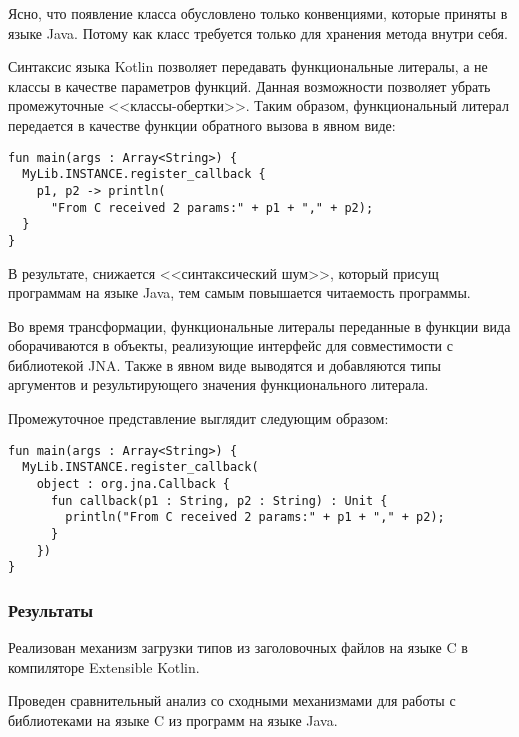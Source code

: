 Ясно, что появление класса  обусловлено только конвенциями, которые приняты в языке Java.
Потому как класс требуется только для хранения метода  внутри себя.

Синтаксис языка Kotlin позволяет передавать функциональные литералы, а не классы в качестве параметров функций.
Данная возможности позволяет убрать промежуточные <<классы-обертки>>.
Таким образом, функциональный литерал передается в качестве функции обратного вызова в явном виде:
\begin{code}\begin{lstlisting}[caption={Пример передачи функционального литерала в качестве функции обратного вызова.}, label=kotlin-callback-example]
fun main(args : Array<String>) {
  MyLib.INSTANCE.register_callback {
    p1, p2 -> println(
      "From C received 2 params:" + p1 + "," + p2);
  }
}
\end{lstlisting}\end{code}

В результате, снижается <<синтаксический шум>>, который присущ программам на языке Java, тем самым повышается читаемость программы.

Во время трансформации, функциональные литералы переданные в функции вида  оборачиваются в объекты, реализующие интерфейс  для совместимости с библиотекой JNA.
Также в явном виде выводятся и добавляются типы аргументов и результирующего значения функционального литерала.

Промежуточное представление выглядит следующим образом:
\begin{code}\begin{lstlisting}[caption={Промежуточное представление программы с трансформацией функции обратного вызова.}, label=transitional-callback-representation]
fun main(args : Array<String>) {
  MyLib.INSTANCE.register_callback(
    object : org.jna.Callback {
      fun callback(p1 : String, p2 : String) : Unit {
        println("From C received 2 params:" + p1 + "," + p2);
      }
    })
}
\end{lstlisting}\end{code}

\subsubsection{Результаты}
Реализован механизм загрузки типов из заголовочных файлов на языке C в компиляторе Extensible Kotlin.

Проведен сравнительный анализ со сходными механизмами для работы с библиотеками на языке C из программ на языке Java.

